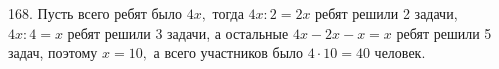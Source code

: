 168. Пусть всего ребят было $4x,$ тогда $4x:2=2x$ ребят решили 2 задачи, $4x:4=x$ ребят решили 3 задачи, а остальные $4x-2x-x=x$ ребят решили 5 задач, поэтому $x=10,$ а всего участников было $4\cdot10=40$ человек.\\
